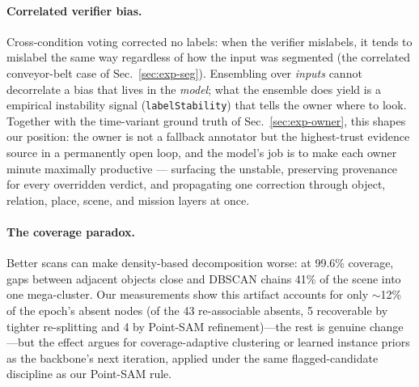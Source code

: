 \paragraph{Correlated verifier bias.}
Cross-condition voting corrected no labels: when the verifier
mislabels, it tends to mislabel the same way regardless of how the
input was segmented (the correlated conveyor-belt case of
Sec.~\ref{sec:exp-seg}). Ensembling over \emph{inputs} cannot decorrelate a
bias that lives in the \emph{model}; what the ensemble does yield is a
empirical instability signal (\texttt{labelStability}) that tells the
owner where to look. Together with the time-variant ground truth of
Sec.~\ref{sec:exp-owner}, this shapes our position: the owner is not a
fallback annotator but the highest-trust evidence source in a
permanently open loop, and the model's job is to make each owner
minute maximally productive --- surfacing the unstable, preserving
provenance for every overridden verdict, and propagating one correction
through object, relation, place, scene, and mission layers at once.

\paragraph{The coverage paradox.}
Better scans can make density-based decomposition worse: at 99.6\% coverage,
gaps between adjacent objects close and DBSCAN chains 41\% of the scene into
one mega-cluster. Our measurements show this artifact accounts for only
$\sim$12\% of the epoch's absent nodes (of the 43 re-associable absents,
5 recoverable by tighter re-splitting and 4 by Point-SAM
refinement)---the rest is genuine change---but
the effect argues for coverage-adaptive clustering or learned instance
priors as the backbone's next iteration, applied under the same
flagged-candidate discipline as our Point-SAM rule.

